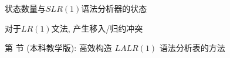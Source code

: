 



\begin{frame}{}
  \begin{center}

    \vspace{0.80cm}
    状态数量与$SLR(1)$语法分析器的状态 \\[10pt]

    \vspace{0.80cm}
    对于$LR(1)$文法, 产生移入/归约冲突
  \end{center}
\end{frame}

\begin{frame}{}
  \begin{center}

    \pause
    \vspace{1.20cm}
    第  节 (本科教学版): 高效构造 $LALR(1)$ 语法分析表的方法
  \end{center}
\end{frame}


